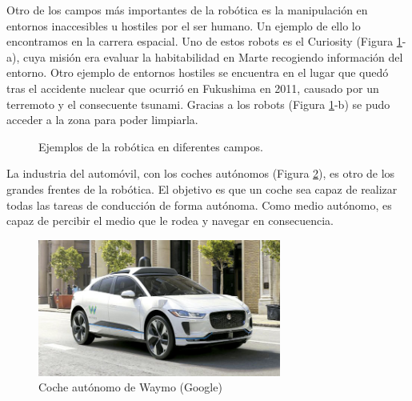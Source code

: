 Otro de los campos más importantes de la robótica es la manipulación en entornos inaccesibles u hostiles por el ser humano. Un ejemplo de ello lo encontramos en la carrera espacial. Uno de estos robots es el Curiosity (Figura \ref{fig:robots}-a), cuya misión era evaluar la habitabilidad en Marte recogiendo información del entorno. Otro ejemplo de entornos hostiles se encuentra en el lugar que quedó tras el accidente nuclear que ocurrió en Fukushima en 2011, causado por un terremoto y el consecuente tsunami. Gracias a los robots (Figura \ref{fig:robots}-b) se pudo acceder a la zona para poder limpiarla.\\
\begin{figure}[h!]
  \begin{center}
    \hspace{2mm}
  \end{center}
\caption{Ejemplos de la robótica en diferentes campos.} \label{fig:robots}
\end{figure}

La industria del automóvil, con los coches autónomos (Figura \ref{fig:coche}), es otro de los grandes frentes de la robótica. El objetivo es que un coche sea capaz de realizar todas las tareas de conducción de forma autónoma. Como medio autónomo, es capaz de percibir el medio que le rodea y navegar en consecuencia.
\begin{figure} [h!]
  \begin{center}
    \includegraphics[width=8cm]{figs/coche}
  \end{center}
  \caption{Coche autónomo de Waymo (Google)}
  \label{fig:coche}
\end{figure}


